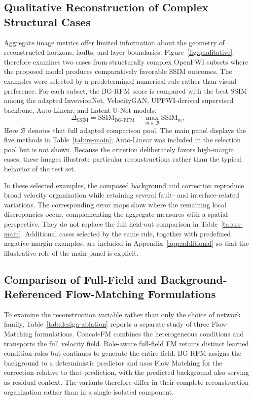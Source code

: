 \subsection{Qualitative Reconstruction of Complex Structural Cases}
\label{sec:results-qualitative}

Aggregate image metrics offer limited information about the geometry of reconstructed horizons, faults, and layer boundaries. Figure~\ref{fig:qualitative} therefore examines two cases from structurally complex OpenFWI subsets where the proposed model produces comparatively favorable SSIM outcomes. The examples were selected by a predetermined numerical rule rather than visual preference. For each subset, the BG-RFM score is compared with the best SSIM among the adapted InversionNet, VelocityGAN, UPFWI-derived supervised backbone, Auto-Linear, and Latent U-Net models:
\begin{equation}
\Delta_{\mathrm{SSIM}}
=
\mathrm{SSIM}_{\mathrm{BG\text{-}RFM}}
-
\max_{m\in\mathcal B}\mathrm{SSIM}_m ,
\end{equation}
Here $\mathcal B$ denotes that full adapted comparison pool. The main panel displays the five methods in Table~\ref{tab:rs-main}; Auto-Linear was included in the selection pool but is not shown. Because the criterion deliberately favors high-margin cases, these images illustrate particular reconstructions rather than the typical behavior of the test set.



In these selected examples, the composed background and correction reproduce broad velocity organization while retaining several fault- and interface-related variations. The corresponding error maps show where the remaining local discrepancies occur, complementing the aggregate measures with a spatial perspective. They do not replace the full held-out comparison in Table~\ref{tab:rs-main}. Additional cases selected by the same rule, together with predefined negative-margin examples, are included in Appendix~\ref{app:additional} so that the illustrative role of the main panel is explicit.

\subsection{Comparison of Full-Field and Background-Referenced Flow-Matching Formulations}

To examine the reconstruction variable rather than only the choice of network family, Table~\ref{tab:design-ablation} reports a separate study of three Flow-Matching formulations. Concat-FM combines the heterogeneous conditions and transports the full velocity field. Role-aware full-field FM retains distinct learned condition roles but continues to generate the entire field. BG-RFM assigns the background to a deterministic predictor and uses Flow Matching for the correction relative to that prediction, with the predicted background also serving as residual context. The variants therefore differ in their complete reconstruction organization rather than in a single isolated component.

